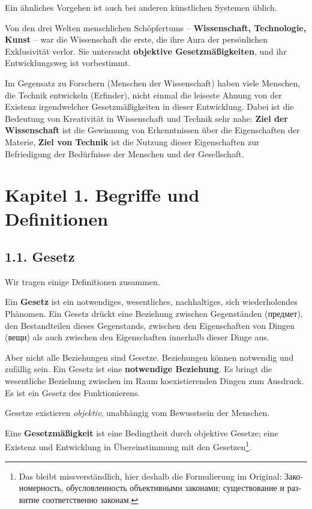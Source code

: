 \documentclass[11pt,a4paper]{article}
\begin{document}
Ein ähnliches Vorgehen ist auch bei anderen künstlichen Systemen üblich.

Von den drei Welten menschlichen Schöpfertums -- \textbf{Wissenschaft,
  Technologie, Kunst} -- war die Wissenschaft die erste, die ihre Aura der
persönlichen Exklusivität verlor. Sie untersucht \textbf{objektive
  Gesetzmäßigkeiten}, und ihr Entwicklungsweg ist vorbestimmt.

Im Gegensatz zu Forschern (Menschen der Wissenschaft) haben viele Menschen,
die Technik entwickeln (Erfinder), nicht einmal die leiseste Ahnung von der
Existenz irgendwelcher Gesetzmäßigkeiten in dieser Entwicklung.
\newpage
Dabei ist die Bedeutung von Kreativität in Wissenschaft und Technik sehr nahe:
\textbf{Ziel der Wissenschaft} ist die Gewinnung von Erkenntnissen über die
Eigenschaften der Materie, \textbf {Ziel von Technik} ist die Nutzung dieser
Eigenschaften zur Befriedigung der Bedürfnisse der Menschen und der
Gesellschaft.

\section*{Kapitel 1. Begriffe und Definitionen}

\subsection*{1.1. Gesetz}

Wir tragen einige Definitionen zusammen.

Ein \textbf{Gesetz} ist ein notwendiges, wesentliches, nachhaltiges, sich
wiederholendes Phänomen. Ein Gesetz drückt eine Beziehung zwischen
Gegenständen (\foreignlanguage{russian}{предмет}), den Bestandteilen dieses
Gegenstands, zwischen den Eigenschaften von Dingen
(\foreignlanguage{russian}{вещи}) als auch zwischen den
Eigenschaften innerhalb dieser Dinge aus.  

Aber nicht alle Beziehungen sind Gesetze. Beziehungen können notwendig und
zufällig sein.  Ein Gesetz ist eine \textbf{notwendige Beziehung}. Es bringt
die wesentliche Beziehung zwischen im Raum koexistierenden Dingen zum
Ausdruck. Es ist ein Gesetz des Funktionierens.

Gesetze existieren \emph{objektiv}, unabhängig vom Bewusstsein der Menschen.

Eine \textbf{Gesetzmäßigkeit} ist eine Bedingtheit durch objektive Gesetze;
eine Existenz und Entwicklung in Übereinstimmung mit den Gesetzen\footnote{Das
  bleibt missverständlich, hier deshalb die Formulierung im Original:
  \foreignlanguage{russian}{Закономерность, обусловленность объективными
    законами; существование и развитие соответственно законам.}}.
\end{document}
